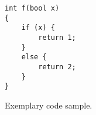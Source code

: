 \begin{figure}[t]
\begin{lstlisting}[frame=single,basicstyle=\ttfamily\small]	
int f(bool x)
{
	if (x) {
		return 1;
	}
	else {
		return 2;
	}
}
\end{lstlisting}
\vspace{-12pt}
\caption{Exemplary code sample.}
\label{figure:sample}
\end{figure}